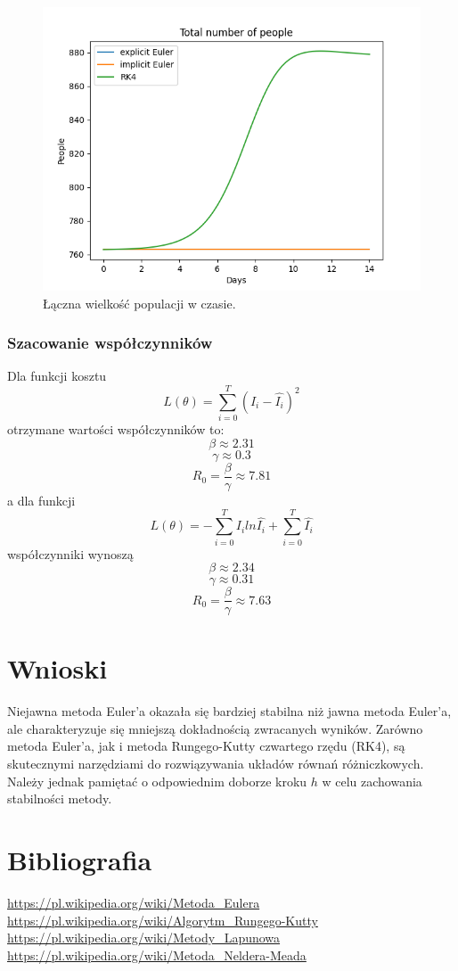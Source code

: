 \documentclass[11pt, leqno]{scrartcl}
\begin{document}
    \begin{figure}[H]
        \centering
        \includegraphics[width=0.7\linewidth]{total_people.png}
        \caption{Łączna wielkość populacji w czasie.}
    \end{figure}

    \subsubsection{Szacowanie współczynników}
    Dla funkcji kosztu
    \[
        L(\theta)=\sum_{i=0}^{T}(I_i-\hat{I_i})^2
    \]
    otrzymane wartości współczynników to:
    \[
        \beta \approx 2.31
    \]
    \[
        \gamma \approx 0.3
    \]
    \[
        R_0=\frac{\beta}{\gamma} \approx 7.81
    \]
    a dla funkcji
    \[
        L(\theta)=-\sum_{i=0}^{T}I_iln\hat{I_i}+
            \sum_{i=0}^{T}\hat{I_i}
    \]
    współczynniki wynoszą
    \[
        \beta \approx 2.34
    \]
    \[
        \gamma \approx 0.31
    \]
    \[
        R_0=\frac{\beta}{\gamma} \approx 7.63
    \]

    \section{Wnioski}
    Niejawna metoda Euler'a okazała się bardziej stabilna niż
    jawna metoda Euler'a, ale charakteryzuje się mniejszą
    dokładnością zwracanych wyników. Zarówno metoda Euler'a,
    jak i metoda Rungego-Kutty czwartego rzędu (RK4), są
    skutecznymi narzędziami do rozwiązywania układów równań
    różniczkowych. Należy jednak pamiętać o odpowiednim doborze
    kroku $h$ w celu zachowania stabilności metody.

    \section{Bibliografia}
    \url{https://pl.wikipedia.org/wiki/Metoda_Eulera} \\
    \url{https://pl.wikipedia.org/wiki/Algorytm_Rungego-Kutty} \\
    \url{https://pl.wikipedia.org/wiki/Metody_Lapunowa} \\
    \url{https://pl.wikipedia.org/wiki/Metoda_Neldera-Meada}
    
\end{document}
